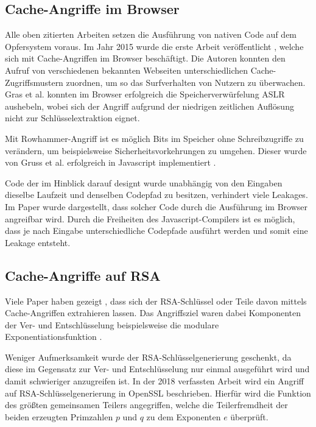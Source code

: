 \subsection{Cache-Angriffe im Browser}

Alle oben zitierten Arbeiten setzen die Ausführung von nativen Code auf dem Opfersystem voraus. Im Jahr 2015 wurde die erste Arbeit veröffentlicht \cite{TheSpyInTheSandbox}, welche sich mit Cache-Angriffen im Browser beschäftigt.
Die Autoren konnten den Aufruf von verschiedenen bekannten Webseiten unterschiedlichen Cache-Zugriffsmustern zuordnen, um so das Surfverhalten von Nutzern zu überwachen.
Gras et al. \cite{ASLROnTheLine} konnten im Browser erfolgreich die Speicherverwürfelung ASLR aushebeln, wobei sich der Angriff aufgrund der niedrigen zeitlichen Auflösung nicht zur Schlüsselextraktion eignet.

Mit Rowhammer-Angriff \cite{Rowhammer} ist es möglich Bits im Speicher ohne Schreibzugriffe zu verändern, um beispielsweise Sicherheitsvorkehrungen zu umgehen. 
Dieser wurde von Gruss et al. erfolgreich in Javascript implementiert \cite{RowhammerJS}.

Code der im Hinblick darauf designt wurde unabhängig von den Eingaben dieselbe Laufzeit und denselben Codepfad zu besitzen, verhindert viele Leakages.
Im Paper \cite{DriveByPaper} wurde dargestellt, dass solcher Code durch die Ausführung im Browser angreifbar wird.
Durch die Freiheiten des Javascript-Compilers ist es möglich, dass je nach Eingabe unterschiedliche Codepfade ausführt werden und somit eine Leakage entsteht.

\subsection{Cache-Angriffe auf RSA}

Viele Paper haben gezeigt \cite{CacheBleedOpenSSLRSA, FlushReload, DriveByPaper}, dass sich der RSA-Schlüssel oder Teile davon mittels Cache-Angriffen extrahieren lassen. Das Angriffsziel waren dabei Komponenten der Ver- und Entschlüsselung beispielsweise die modulare Exponentiationsfunktion \cite{CacheBleedOpenSSLRSA, DriveByPaper, DriveByPaper}. 


Weniger Aufmerksamkeit wurde der RSA-Schlüsselgenerierung geschenkt, da diese im Gegensatz zur Ver- und Entschlüsselung nur einmal ausgeführt wird und damit schwieriger anzugreifen ist.
In der 2018 verfassten Arbeit \cite{RSAKeyGeneration2} wird ein Angriff auf RSA-Schlüsselgenerierung in OpenSSL beschrieben.
Hierfür wird die Funktion des größten gemeinsamen Teilers angegriffen, welche die Teilerfremdheit der beiden erzeugten Primzahlen $p$ und $q$ zu dem Exponenten $e$ überprüft.

